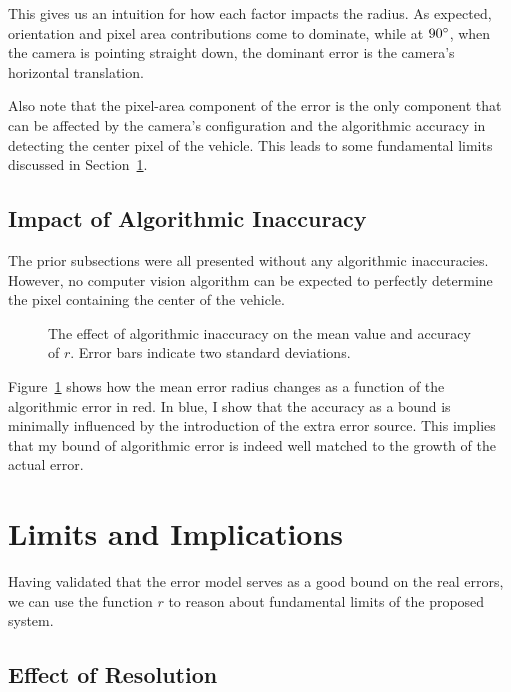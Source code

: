\documentclass[a4paper,12pt,twoside,openright]{report}
\begin{document}
This gives us an intuition for how each factor impacts the radius.
As expected, orientation and pixel area contributions
come to dominate, while at $90\degree$, when the camera is pointing straight down, the dominant
error is the camera's horizontal translation.

Also note that the pixel-area component of the error is the only component that
can be affected by the camera's configuration and the algorithmic 
accuracy in detecting the center pixel of the vehicle. This leads
to some fundamental limits discussed in Section~\ref{sec:camera:implications}.

\subsection{Impact of Algorithmic Inaccuracy}

The prior subsections were all presented without any algorithmic inaccuracies.
However, no computer vision algorithm can be expected to perfectly determine
the pixel containing the center of the vehicle.

\begin{figure}[htb]
    \begin{center}
        
    \end{center}
    \caption[Effect of Algorithmic Inaccuracy]{The effect of algorithmic inaccuracy on the mean value and accuracy of $r$. Error bars indicate two standard deviations.}
    \label{fig:camera:algorithm effect}
\end{figure}


Figure~\ref{fig:camera:algorithm effect} shows how the mean error radius changes as a function of the 
algorithmic error in red. In blue, I show that the accuracy as a bound is minimally influenced 
by the introduction of the extra error source. This implies that my bound of
algorithmic error is indeed well matched to the growth of the actual error.


\section{Limits and Implications}
\label{sec:camera:implications}

Having validated that the error model serves as a good bound on the real errors, we can use the function $r$
to reason about fundamental limits of the proposed system.

\subsection{Effect of Resolution}
\end{document}
